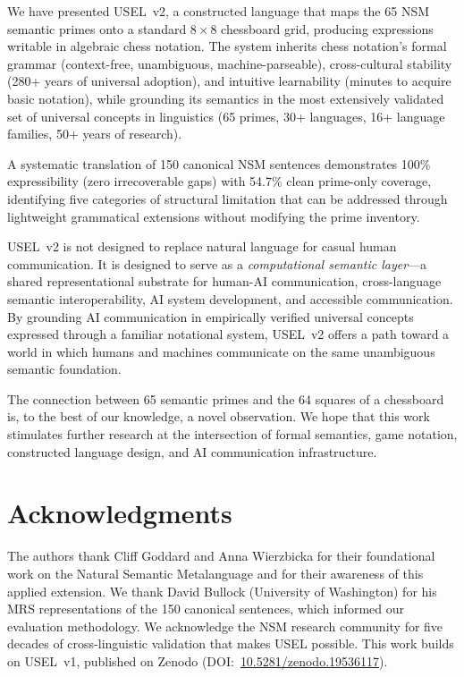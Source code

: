 \documentclass[11pt,a4paper]{article}
\begin{document}
We have presented USEL~v2, a constructed language that maps the 65 NSM semantic primes onto a standard $8 \times 8$ chessboard grid, producing expressions writable in algebraic chess notation. The system inherits chess notation's formal grammar (context-free, unambiguous, machine-parseable), cross-cultural stability (280+ years of universal adoption), and intuitive learnability (minutes to acquire basic notation), while grounding its semantics in the most extensively validated set of universal concepts in linguistics (65 primes, 30+ languages, 16+ language families, 50+ years of research).

A systematic translation of 150 canonical NSM sentences demonstrates 100\% expressibility (zero irrecoverable gaps) with 54.7\% clean prime-only coverage, identifying five categories of structural limitation that can be addressed through lightweight grammatical extensions without modifying the prime inventory.

USEL~v2 is not designed to replace natural language for casual human communication. It is designed to serve as a \emph{computational semantic layer}---a shared representational substrate for human-AI communication, cross-language semantic interoperability, AI system development, and accessible communication. By grounding AI communication in empirically verified universal concepts expressed through a familiar notational system, USEL~v2 offers a path toward a world in which humans and machines communicate on the same unambiguous semantic foundation.

The connection between 65 semantic primes and the 64 squares of a chessboard is, to the best of our knowledge, a novel observation. We hope that this work stimulates further research at the intersection of formal semantics, game notation, constructed language design, and AI communication infrastructure.

\section*{Acknowledgments}

The authors thank Cliff Goddard and Anna Wierzbicka for their foundational work on the Natural Semantic Metalanguage and for their awareness of this applied extension. We thank David Bullock (University of Washington) for his MRS representations of the 150 canonical sentences, which informed our evaluation methodology. We acknowledge the NSM research community for five decades of cross-linguistic validation that makes USEL possible. This work builds on USEL~v1, published on Zenodo (DOI:~\href{https://doi.org/10.5281/zenodo.19536117}{10.5281/zenodo.19536117}).
\end{document}
